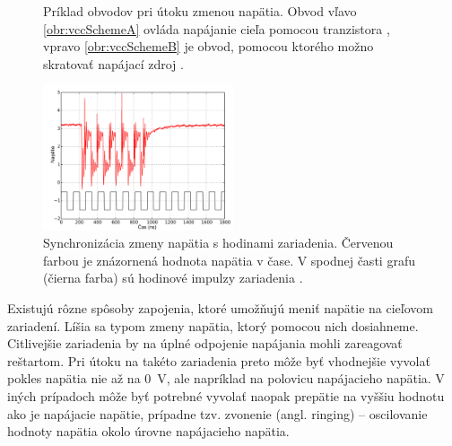 \begin{figure}[!tbp]
  \centering
  \hfill
  \caption[Príklad obvodov pri útoku zmenou napätia]{Príklad obvodov pri útoku zmenou napätia. Obvod vľavo \ref{obr:vccSchemeA} ovláda napájanie cieľa pomocou tranzistora \cite{vccOnTheCheap}, vpravo \ref{obr:vccSchemeB} je obvod, pomocou ktorého možno skratovať napájací zdroj \cite{crowbars}.}
  \label{obr:vccScheme}
\end{figure}

\begin{figure}
    \centerline{\includegraphics[width=0.5\textwidth]{images/vccSync.png}}
    \caption[Synchronizácia zmeny napätia s hodinami zariadenia]{Synchronizácia zmeny napätia s hodinami zariadenia. Červenou farbou je znázornená hodnota napätia v čase. V spodnej časti grafu (čierna farba) sú hodinové impulzy zariadenia \cite{crowbars}.}
    \label{obr:vccSync}
\end{figure}

Existujú rôzne spôsoby zapojenia, ktoré umožňujú meniť napätie na cieľovom zariadení. Líšia sa typom zmeny napätia, ktorý pomocou nich dosiahneme. Citlivejšie zariadenia by na úplné odpojenie napájania mohli zareagovať reštartom. Pri útoku na takéto zariadenia preto môže byť vhodnejšie vyvolať pokles napätia nie až na 0~V, ale napríklad na polovicu napájacieho napätia. V iných prípadoch môže byť potrebné vyvolať naopak prepätie na vyššiu hodnotu ako je napájacie napätie, prípadne tzv. zvonenie (angl. ringing) -- oscilovanie hodnoty napätia okolo úrovne napájacieho napätia.

